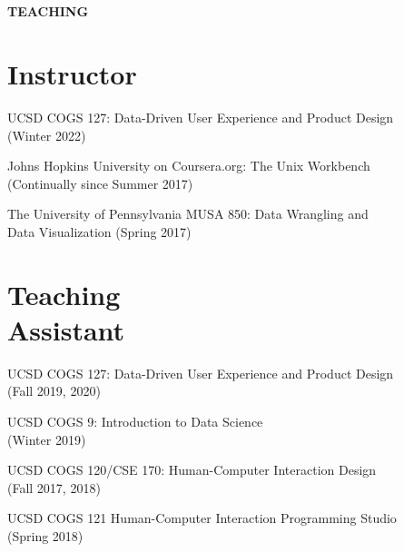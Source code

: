
\section{} \textbf{TEACHING} \vspace{-0.05in}

\section{Instructor}

\begin{innerlist}
\item UCSD COGS 127: Data-Driven User Experience and Product Design  \\ (Winter 2022)
\item Johns Hopkins University on Coursera.org: The Unix Workbench \\ (Continually since Summer 2017)
\item The University of Pennsylvania MUSA 850: Data Wrangling and \\ Data Visualization (Spring 2017)
\end{innerlist}

\section{Teaching\\Assistant}

\begin{innerlist}
\item UCSD COGS 127: Data-Driven User Experience and Product Design  \\ (Fall 2019, 2020)
\item UCSD COGS 9: Introduction to Data Science  \\ (Winter 2019)
\item UCSD COGS 120/CSE 170: Human-Computer Interaction Design \\ (Fall 2017, 2018)
\item UCSD COGS 121 Human-Computer Interaction Programming Studio \\ (Spring 2018)
\end{innerlist}

